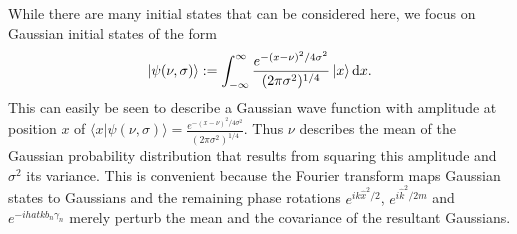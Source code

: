 \documentclass[superscriptaddress,aps,pra,nofootinbib,onecolumn,notitlepage,10pt]{revtex4-1}
\def\ket#1{\mathinner{|{#1}\rangle}}
\newcommand{\braket}[2]{\langle #1|#2\rangle}
\begin{document}
While there are many initial states that can be considered here, we focus on Gaussian initial states of the form
\begin{equation}
\ket{\psi(\nu,\sigma)}:=\int_{-\infty}^\infty \frac{e^{-(x-\nu)^2/4\sigma^2}}{(2\pi \sigma^2)^{1/4}}\ket{x}\mathrm{d}x.
\end{equation}
This can easily be seen to describe a Gaussian wave function with amplitude at position $x$ of $\braket{x}{\psi(\nu,\sigma)} = \frac{e^{-(x-\nu)^2/4\sigma^2}}{(2\pi \sigma^2)^{1/4}}$.  Thus $\nu$ describes the mean of the Gaussian probability distribution that results from squaring this amplitude and $\sigma^2$ its variance.  This is convenient because the Fourier transform maps Gaussian states to Gaussians and the remaining phase rotations $e^{ik\hat{x}^2/2}$, $e^{i\hat{k}^2/2m}$ and $e^{-i hat{k} b_n \gamma_n}$ merely perturb the mean and the covariance of the resultant Gaussians.
\end{document}
